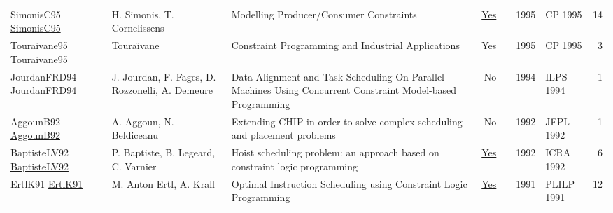 {\begin{longtable}{p{3cm}p{6cm}p{7cm}rrrp{3cm}r}
SimonisC95 \href{https://doi.org/10.1007/3-540-60299-2\_27}{SimonisC95} & H. Simonis, T. Cornelissens & Modelling Producer/Consumer Constraints & \href{papers/SimonisC95.pdf}{Yes} & \cite{SimonisC95} & 1995 & CP 1995 & 14\\
Touraivane95 \href{https://doi.org/10.1007/3-540-60299-2\_41}{Touraivane95} & Toura{\"{\i}}vane & Constraint Programming and Industrial Applications & \href{papers/Touraivane95.pdf}{Yes} & \cite{Touraivane95} & 1995 & CP 1995 & 3\\
JourdanFRD94 \href{}{JourdanFRD94} & J. Jourdan, F. Fages, D. Rozzonelli, A. Demeure & Data Alignment and Task Scheduling On Parallel Machines Using Concurrent Constraint Model-based Programming & No & \cite{JourdanFRD94} & 1994 & ILPS 1994 & 1\\
AggounB92 \href{}{AggounB92} & A. Aggoun, N. Beldiceanu & Extending {CHIP} in order to solve complex scheduling and placement problems & No & \cite{AggounB92} & 1992 & JFPL 1992 & 1\\
BaptisteLV92 \href{https://doi.org/10.1109/ROBOT.1992.220195}{BaptisteLV92} & P. Baptiste, B. Legeard, C. Varnier & Hoist scheduling problem: an approach based on constraint logic programming & \href{papers/BaptisteLV92.pdf}{Yes} & \cite{BaptisteLV92} & 1992 & ICRA 1992 & 6\\
ErtlK91 \href{https://doi.org/10.1007/3-540-54444-5\_89}{ErtlK91} & M. Anton Ertl, A. Krall & Optimal Instruction Scheduling using Constraint Logic Programming & \href{papers/ErtlK91.pdf}{Yes} & \cite{ErtlK91} & 1991 & PLILP 1991 & 12\\
\end{longtable}
}

